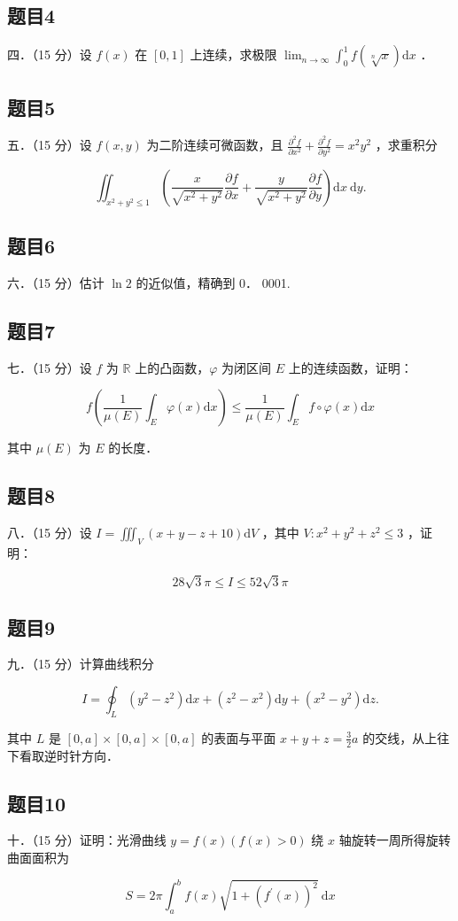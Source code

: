 \documentclass{article}
\begin{document}
\subsection{题目4}
四．（15 分）设 \(f(x)\) 在 \([0,1]\) 上连续，求极限 \(\lim _{n \rightarrow \infty} \int_{0}^{1} f(\sqrt[n]{x}) \mathrm{d} x\) ．

\subsection{题目5}
五．（15 分）设 \(f(x, y)\) 为二阶连续可微函数，且 \(\frac{\partial^{2} f}{\partial x^{2}}+\frac{\partial^{2} f}{\partial y^{2}}=x^{2} y^{2}\) ，求重积分

\[
\iint_{x^{2}+y^{2} \leq 1}\left(\frac{x}{\sqrt{x^{2}+y^{2}}} \frac{\partial f}{\partial x}+\frac{y}{\sqrt{x^{2}+y^{2}}} \frac{\partial f}{\partial y}\right) \mathrm{d} x \mathrm{~d} y .
\]

\subsection{题目6}
六．（15 分）估计 \(\ln 2\) 的近似值，精确到 0． 0001.

\subsection{题目7}
七．（15 分）设 \(f\) 为 \(\mathbb{R}\) 上的凸函数，\(\varphi\) 为闭区间 \(E\) 上的连续函数，证明：

\[
f\left(\frac{1}{\mu(E)} \int_{E} \varphi(x) \mathrm{d} x\right) \leq \frac{1}{\mu(E)} \int_{E} f \circ \varphi(x) \mathrm{d} x
\]

其中 \(\mu(E)\) 为 \(E\) 的长度．

\subsection{题目8}
八．（15 分）设 \(I=\iiint_{V}(x+y-z+10) \mathrm{d} V\) ，其中 \(V: x^{2}+y^{2}+z^{2} \leq 3\) ，证明：

\[
28 \sqrt{3} \pi \leq I \leq 52 \sqrt{3} \pi
\]

\subsection{题目9}
九．（15 分）计算曲线积分

\[
I=\oint_{L}\left(y^{2}-z^{2}\right) \mathrm{d} x+\left(z^{2}-x^{2}\right) \mathrm{d} y+\left(x^{2}-y^{2}\right) \mathrm{d} z .
\]

其中 \(L\) 是 \([0, a] \times[0, a] \times[0, a]\) 的表面与平面 \(x+y+z=\frac{3}{2} a\) 的交线，从上往下看取逆时针方向．

\subsection{题目10}
十．（15 分）证明：光滑曲线 \(y=f(x)(f(x)>0)\) 绕 \(x\) 轴旋转一周所得旋转曲面面积为

\[
S=2 \pi \int_{a}^{b} f(x) \sqrt{1+\left(f^{\prime}(x)\right)^{2}} \mathrm{~d} x
\]
\end{document}

